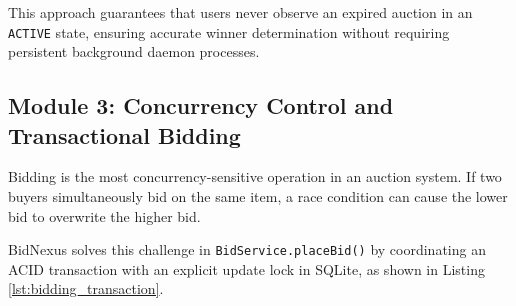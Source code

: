 This approach guarantees that users never observe an expired auction in an \texttt{ACTIVE} state, ensuring accurate winner determination without requiring persistent background daemon processes.

\subsection{Module 3: Concurrency Control and Transactional Bidding}
Bidding is the most concurrency-sensitive operation in an auction system. If two buyers simultaneously bid on the same item, a race condition can cause the lower bid to overwrite the higher bid.

BidNexus solves this challenge in \texttt{BidService.placeBid()} by coordinating an ACID transaction with an explicit update lock in SQLite, as shown in Listing \ref{lst:bidding_transaction}.

